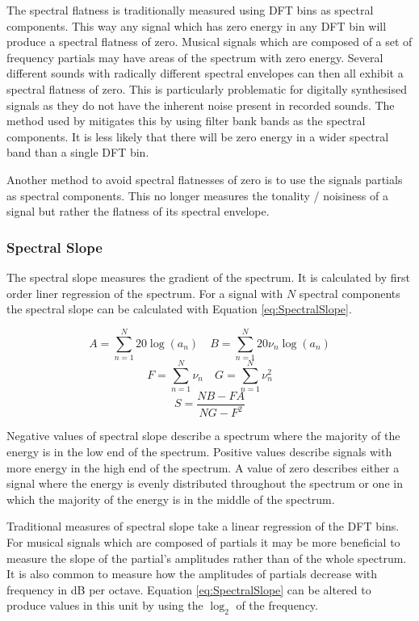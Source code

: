 			The spectral flatness is traditionally measured using DFT bins as spectral components. This way any
			signal which has zero energy in any DFT bin will produce a spectral flatness of zero. Musical
			signals which are composed of a set of frequency partials may have areas of the spectrum with zero
			energy. Several different sounds with radically different spectral envelopes can then all exhibit a
			spectral flatness of zero. This is particularly problematic for digitally synthesised signals as
			they do not have the inherent noise present in recorded sounds. The method used by
			\citet{peeters2004a} mitigates this by using filter bank bands as the spectral components. It is
			less likely that there will be zero energy in a wider spectral band than a single DFT bin. 
			
			Another method to avoid spectral flatnesses of zero is to use the signals partials as spectral
			components.  This no longer measures the tonality / noisiness of a signal but rather the flatness of
			its spectral envelope.

		\subsubsection*{Spectral Slope}
			The spectral slope measures the gradient of the spectrum. It is calculated by first order liner
			regression of the spectrum. For a signal with $N$ spectral components the spectral slope can be
			calculated with Equation \ref{eq:SpectralSlope}.

			\[ A = \sum_{n = 1}^{N} 20\log (a_{n}) \quad B = \sum_{n = 1}^{N} 20\nu_{n}\log (a_{n}) \]
			\[ F = \sum_{n = 1}^{N} \nu_{n} \quad G = \sum_{n = 1}^{N} \nu_{n}^{2} \]
			\begin{equation}
				S = \frac{NB - FA}
					 {NG - F^{2}}
				\label{eq:SpectralSlope}
			\end{equation}

			Negative values of spectral slope describe a spectrum where the majority of the energy is in the low
			end of the spectrum. Positive values describe signals with more energy in the high end of the
			spectrum. A value of zero describes either a signal where the energy is evenly distributed
			throughout the spectrum or one in which the majority of the energy is in the middle of the spectrum.

			Traditional measures of spectral slope take a linear regression of the DFT bins. For musical signals
			which are composed of partials it may be more beneficial to measure the slope of the partial's
			amplitudes rather than of the whole spectrum. It is also common to measure how the amplitudes of
			partials decrease with frequency in dB per octave. Equation \ref{eq:SpectralSlope} can be altered to
			produce values in this unit by using the $\log_{2}$ of the frequency.

